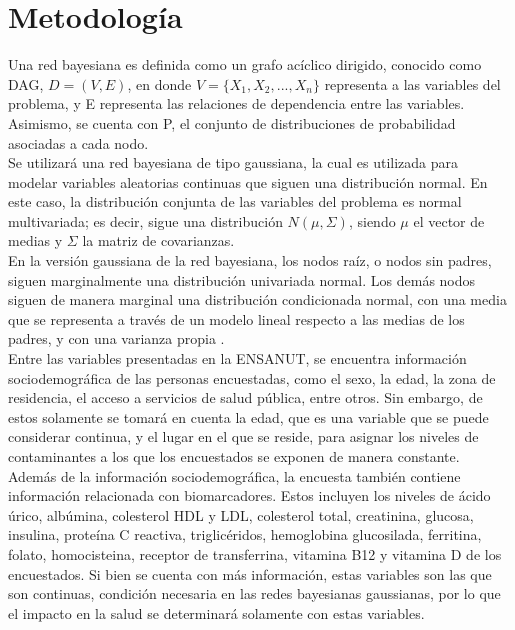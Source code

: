 \documentclass[12pt, letterpaper]{report}
\begin{document}
\section*{Metodología}

Una red bayesiana es definida como un grafo acíclico dirigido, conocido como DAG, $D=(V,E)$, en donde $V=\{X_1,X_2,...,X_n\}$ representa a las variables del problema, y E representa las relaciones de dependencia entre las variables. Asimismo, se cuenta con P, el conjunto de distribuciones de probabilidad asociadas a cada nodo.
\\

Se utilizará una red bayesiana de tipo gaussiana, la cual es utilizada para modelar variables aleatorias continuas que siguen una distribución normal. En este caso, la distribución conjunta de las variables del problema es normal multivariada; es decir, sigue una distribución $N(\mu, \Sigma)$, siendo $\mu$ el vector de medias y $\Sigma$ la matriz de covarianzas. \cite{tesis}
\\

En la versión gaussiana de la red bayesiana, los nodos raíz, o nodos sin padres, siguen marginalmente una distribución univariada normal. Los demás nodos siguen de manera marginal una distribución condicionada normal, con una media que se representa a través de un modelo lineal respecto a las medias de los padres, y con una varianza propia \cite{scutari2021bayesian}.
\\

Entre las variables presentadas en la ENSANUT, se encuentra información sociodemográfica de las personas encuestadas, como el sexo, la edad, la zona de residencia, el acceso a servicios de salud pública, entre otros. Sin embargo, de estos solamente se tomará en cuenta la edad, que es una variable que se puede considerar continua, y el lugar en el que se reside, para asignar los niveles de contaminantes a los que los encuestados se exponen de manera constante.
\\

Además de la información sociodemográfica, la encuesta también contiene información relacionada con biomarcadores. Estos incluyen los niveles de ácido úrico, albúmina, colesterol HDL y LDL, colesterol total, creatinina, glucosa, insulina, proteína C reactiva, triglicéridos, hemoglobina glucosilada, ferritina, folato, homocisteina, receptor de transferrina, vitamina B12 y vitamina D de los encuestados. Si bien se cuenta con más información, estas variables son las que son continuas, condición necesaria en las redes bayesianas gaussianas, por lo que el impacto en la salud se determinará solamente con estas variables.
\\
\end{document}
